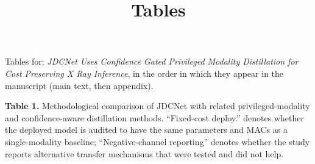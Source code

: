 \documentclass[pdflatex,sn-vancouver,Numbered]{sn-jnl}
\begin{document}
\title{Tables}
\author*[1]{ }
\maketitle
\noindent Tables for: \textit{JDCNet Uses Confidence Gated Privileged Modality Distillation for Cost Preserving X Ray Inference}, in the order in which they appear in the manuscript (main text, then appendix).
\clearpage

\begin{minipage}{\textwidth}
{\small\noindent\textbf{Table 1.} Methodological comparison of JDCNet with related privileged-modality and confidence-aware distillation methods. ``Fixed-cost deploy.'' denotes whether the deployed model is audited to have the same parameters and MACs as a single-modality baseline; ``Negative-channel reporting'' denotes whether the study reports alternative transfer mechanisms that were tested and did not help.\par}
\vspace{6pt}



\end{minipage}
\end{document}
